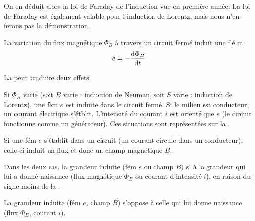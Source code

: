 \documentclass[12pt,fancy]{cours}
\begin{document}
On en déduit alors la loi de Faraday de l'induction vue en première année. La loi de Faraday est également valable pour l’induction de Lorentz, mais nous n’en ferons pas la démonstration. 
\begin{theorem}\label{form:faraday}
  La variation du flux magnétique $\Phi_B$ à travers un circuit fermé induit une f.é.m.
\begin{equation*}
e=-\frac{\mathrm{d}\Phi_B}{\mathrm{d} t}
\end{equation*}
\end{theorem}
\noindent La  peut traduire deux effets.
\begin{liste}
\item Si $\Phi_B$ varie (soit $B$ varie : induction de Neuman, soit $S$ varie : induction de Lorentz), une fém $e$ est induite dans le circuit fermé. Si le milieu est conducteur, un courant électrique s’étblit. L’intensité du courant $i$ est orienté  que $e$ (le circuit fonctionne comme un générateur).  Ces situations sont représentées sur la .

\item Si une fém $e$ s’établit dans un circuit (un courant circule dans un conducteur), celle-ci induit un flux et donc un champ magnétique $B$.
\end{liste}
Dans les deux cas, la grandeur induite (fém $e$ ou champ $B$) s’ à la grandeur qui lui a donné naissance (flux magnétique $\Phi_B$ ou courant d’intensité $i$), en raison du signe moins de la .
\begin{prop}\label{prop:}
La grandeur induite (fém $e$, champ $B$) s’oppose à celle qui lui donne naissance (flux $\Phi_B$, courant $i$).
\end{prop}
\end{document}
